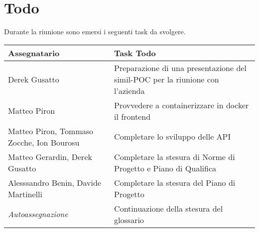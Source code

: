 \section{Todo}
Durante la riunione sono emersi i seguenti task da svolgere.

\begin{center}
  \begin{tabular}{|p{5cm}|p{8cm}|}
    \hline
    \textbf{Assegnatario}       & \textbf{Task Todo} \\ \hline
    Derek Gusatto & Preparazione di una presentazione del simil-POC per la riunione con l'azienda  \\ \hline
    Matteo Piron & Provvedere a containerizzare in docker il frontend  \\ \hline
    Matteo Piron, Tommaso Zocche, Ion Bourosu & Completare lo sviluppo delle API \\ \hline
    Matteo Gerardin, Derek Gusatto & Completare la stesura di Norme di Progetto e Piano di Qualifica \\ \hline
    Alesssandro Benin, Davide Martinelli & Completare la stesura del Piano di Progetto \\ \hline
    \textit{Autoassegnazione} & Continuazione della stesura del glossario \\ \hline
  \end{tabular}
\end{center}